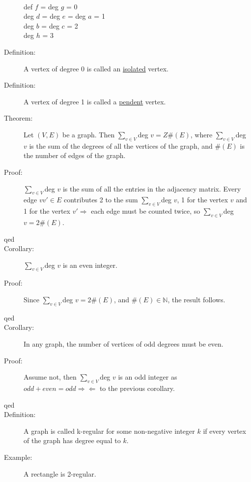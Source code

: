 \documentclass[10pt]{article}
\begin{document}
\begin{description}
\begin{figure}[h!]
		\end{figure}
		~\\
		def $f$ = deg $g$ = 0 \\
		deg $d$ = deg $e$ = deg $a$ = 1 \\
		deg $b$ = deg $c$ = 2 \\
		deg $h$ = 3 \\
		\item[Definition:] A vertex of degree 0 is called an \underline{isolated} vertex.
		\item[Definition:] A vertex of degree 1 is called a \underline{pendent} vertex.
		\item[Theorem:] Let $(V, E)$ be a graph. Then $\sum_{v \in V}$deg $v = Z\#(E)$, where $\sum_{v \in V}$deg $v$ is the sum of the degrees of all the vertices of the graph, and $\#(E)$ is the number of edges of the graph.
		\item[Proof:] $\sum_{v \in V}$deg $v$ is the sum of all the entries in the adjacency matrix. Every edge $vv' \in E$ contributes 2 to the sum $\sum_{v \in V}$deg $v$, 1 for the vertex $v$ and 1 for the vertex $v' \Rightarrow$ each edge must be counted twice, so $\sum_{v \in V}$deg $v = 2 \#(E)$.
		\item[qed]
		\item[Corollary:] $\sum_{v \in V}$deg $v$ is an even integer.
		\item[Proof:] Since $\sum_{v \in V}$deg $v = 2 \#(E)$, and $\#(E) \in \mathbb{N}$, the result follows.
		\item[qed]
		\item[Corollary:] In any graph, the number of vertices of odd degrees must be even.
		\item[Proof:] Assume not, then $\sum_{v \in V}$deg $v$ is an odd integer as $odd + even = odd \Rightarrow \Leftarrow$ to the previous corollary.
		\item[qed]
		\item[Definition:] A graph is called k-regular for some non-negative integer $k$ if every vertex of the graph has degree equal to $k$.
		\item[Example:] A rectangle is 2-regular. \\
		\begin{figure}[h!]
			\centering
\end{figure}
\end{description}
\end{document}

